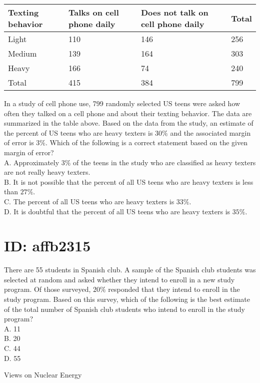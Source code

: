 

\begin{center}
\begin{tabular}{|l|l|l|l|}
\hline
Texting behavior & Talks on cell phone daily & Does not talk on cell phone daily & Total \\
\hline
Light & 110 & 146 & 256 \\
\hline
Medium & 139 & 164 & 303 \\
\hline
Heavy & 166 & 74 & 240 \\
\hline
Total & 415 & 384 & 799 \\
\hline
\end{tabular}
\end{center}

In a study of cell phone use, 799 randomly selected US teens were asked how often they talked on a cell phone and about their texting behavior. The data are summarized in the table above. Based on the data from the study, an estimate of the percent of US teens who are heavy texters is $30 \%$ and the associated margin of error is $3 \%$. Which of the following is a correct statement based on the given margin of error?\\
A. Approximately $3 \%$ of the teens in the study who are classified as heavy texters are not really heavy texters.\\
B. It is not possible that the percent of all US teens who are heavy texters is less than $27 \%$.\\
C. The percent of all US teens who are heavy texters is $33 \%$.\\
D. It is doubtful that the percent of all US teens who are heavy texters is $35 \%$.

\section*{ID: affb2315}
There are 55 students in Spanish club. A sample of the Spanish club students was selected at random and asked whether they intend to enroll in a new study program. Of those surveyed, $20 \%$ responded that they intend to enroll in the study program. Based on this survey, which of the following is the best estimate of the total number of Spanish club students who intend to enroll in the study program?\\
A. 11\\
B. 20\\
C. 44\\
D. 55

Views on Nuclear Energy

